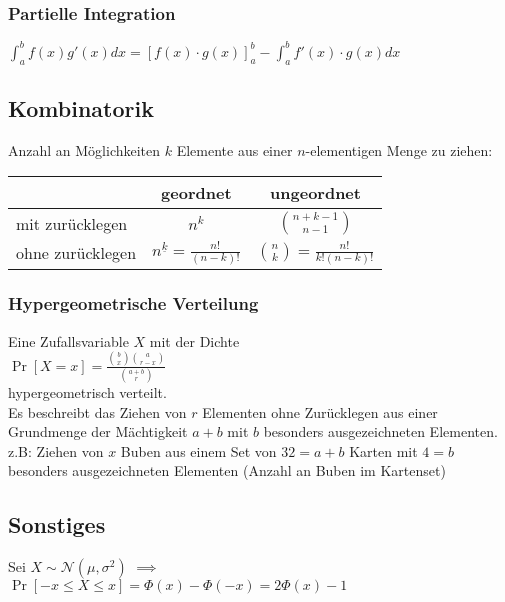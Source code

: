 \documentclass[a4paper,9pt]{extarticle}
\newcommand{\intab}[1] {\int_{a}^{b} #1 dx}
\begin{document}
\subsubsection*{Partielle Integration}
$\intab{f(x)g'(x)} = [f(x) ⋅ g(x)]_a^b - \intab{f'(x) ⋅ g(x)}$	


\subsection*{Kombinatorik}
Anzahl an Möglichkeiten $k$ Elemente aus einer $n$-elementigen Menge zu ziehen: \\
\begin{tabular}{|l|c|c|}
	\hline
	& geordnet & ungeordnet \\
	\hline
	mit zurücklegen & $n^k$ & $\binom{n + k - 1}{n - 1}$ \\
	\hline
	ohne zurücklegen & $n^{\underline{k}} = \frac{n!}{(n - k)!}$ & $\binom{n}{k} = \frac{n!}{k!(n - k)!}$ \\
	\hline
\end{tabular}

\subsubsection*{Hypergeometrische Verteilung}
Eine Zufallsvariable $X$ mit der Dichte \\
$\Pr[X = x] = \frac{\binom{b}{x} \binom{a}{r - x}}{\binom{a + b}{r}}$ \\
hypergeometrisch verteilt. \\
Es beschreibt das Ziehen von $r$ Elementen ohne Zurücklegen aus einer Grundmenge der Mächtigkeit $a + b$ mit $b$ besonders ausgezeichneten Elementen. \\
z.B: Ziehen von $x$ Buben aus einem Set von $32 = a + b$ Karten mit $4 = b$ besonders ausgezeichneten Elementen (Anzahl an Buben im Kartenset)

\subsection*{Sonstiges}
Sei $X \sim \mathcal{N}(\mu, \sigma^2)$ $\implies$ \\
$\Pr[-x ≤ X ≤ x] = \Phi(x) - \Phi(-x) = 2\Phi(x) -1$
\end{document}
